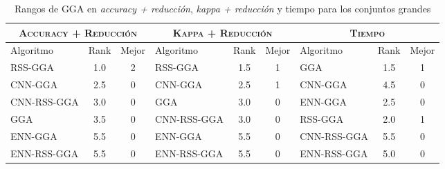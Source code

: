 \begin{table}[h!]
\centering
\begin{adjustbox}{max width =\textwidth}
\begin{tabular}{l c c|l c c|l c c}
\hline
\multicolumn{3}{c|}{\textsc{Accuracy + Reducción}}
	& \multicolumn{3}{c|}{\textsc{Kappa + Reducción}}
	& \multicolumn{3}{c}{\textsc{Tiempo}} \\
\hline
Algoritmo & Rank & Mejor & Algoritmo & Rank & Mejor & Algoritmo & Rank & Mejor \\
\hline
\hline

RSS-GGA     & 1.0 & 2 & RSS-GGA     & 1.5 & 1 & GGA         & 1.5 & 1 \\ 
CNN-GGA     & 2.5 & 0 & CNN-GGA     & 2.5 & 1 & CNN-GGA     & 4.5 & 0 \\
CNN-RSS-GGA & 3.0 & 0 & GGA         & 3.0 & 0 & ENN-GGA     & 2.5 & 0 \\
GGA         & 3.5 & 0 & CNN-RSS-GGA & 3.0 & 0 & RSS-GGA     & 2.0 & 1 \\
ENN-GGA     & 5.5 & 0 & ENN-GGA     & 5.5 & 0 & CNN-RSS-GGA & 5.5 & 0 \\
ENN-RSS-GGA & 5.5 & 0 & ENN-RSS-GGA & 5.5 & 0 & ENN-RSS-GGA & 5.0 & 0 \\

\hline
\end{tabular}
\end{adjustbox}
\caption{Rangos de GGA en \emph{accuracy + reducción}, \emph{kappa + reducción} y tiempo para los conjuntos grandes}
\label{rank-gga-large}
\end{table}





